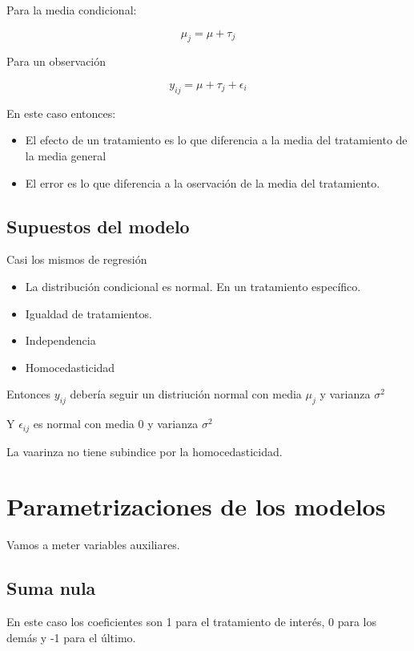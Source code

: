 \documentclass[
]{article}
\begin{document}
Para la media condicional:

\[
\mu_j=\mu+\tau_j
\]

Para un observación

\[
y_{ij}=\mu+\tau_j+\epsilon_i
\]

En este caso entonces:

\begin{itemize}
\item
  El efecto de un tratamiento es lo que diferencia a la media del
  tratamiento de la media general
\item
  El error es lo que diferencia a la oservación de la media del
  tratamiento.
\end{itemize}

\subsection{Supuestos del modelo}\label{supuestos-del-modelo}

Casi los mismos de regresión

\begin{itemize}
\item
  La distribución condicional es normal. En un tratamiento específico.
\item
  Igualdad de tratamientos.
\item
  Independencia
\item
  Homocedasticidad
\end{itemize}

Entonces \(y_{ij}\) debería seguir un distriución normal con media
\(\mu_j\) y varianza \(\sigma^2\)

Y \(\epsilon_{ij}\) es normal con media 0 y varianza \(\sigma^2\)

La vaarinza no tiene subindice por la homocedasticidad.

\section{Parametrizaciones de los
modelos}\label{parametrizaciones-de-los-modelos}

Vamos a meter variables auxiliares.

\subsection{Suma nula}\label{suma-nula}

En este caso los coeficientes son 1 para el tratamiento de interés, 0
para los demás y -1 para el último.
\end{document}
